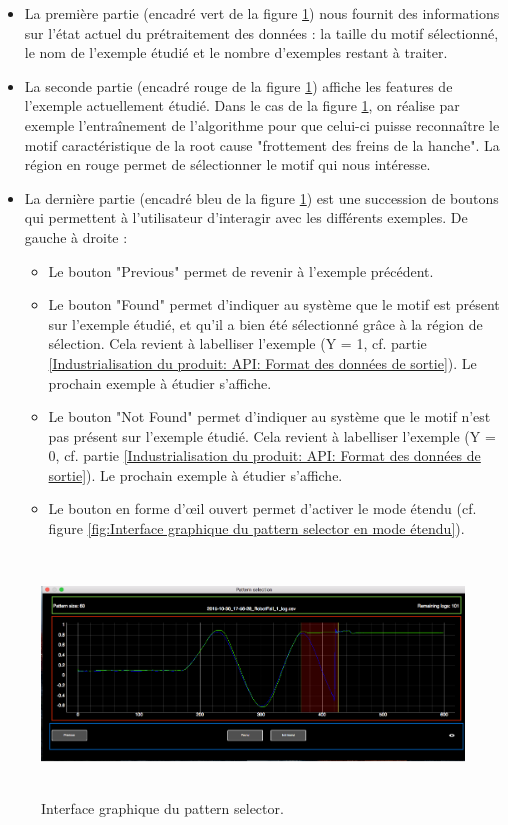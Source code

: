 \begin{itemize}
	\item La première partie (encadré vert de la figure \ref{fig:Interface graphique du pattern selector}) nous fournit des informations sur l'état actuel du prétraitement des données : la taille du motif sélectionné, le nom de l'exemple étudié et le nombre d'exemples restant à traiter. 
	\item La seconde partie (encadré rouge de la figure  \ref{fig:Interface graphique du pattern selector}) affiche les features de l'exemple actuellement étudié. Dans le cas de la figure  \ref{fig:Interface graphique du pattern selector}, on réalise par exemple l'entraînement de l'algorithme pour que celui-ci puisse reconnaître le motif caractéristique de la root cause "frottement des freins de la hanche". La région en rouge permet de sélectionner le motif qui nous intéresse.
	\item La dernière partie (encadré bleu de la figure  \ref{fig:Interface graphique du pattern selector}) est une succession de boutons qui permettent à l'utilisateur d'interagir avec les différents exemples. De gauche à droite :   
	\begin{itemize}
		\item Le  bouton "Previous" permet de revenir à l'exemple précédent.
		\item Le bouton "Found" permet d'indiquer au système que le motif est présent sur l'exemple étudié, et qu'il a bien été sélectionné grâce à la région de sélection. Cela revient à labelliser l'exemple (Y = 1, cf. partie \ref{Industrialisation du produit: API: Format des données de sortie}). Le prochain exemple à étudier s'affiche.
		\item Le bouton "Not Found" permet d'indiquer au système que le motif n'est pas présent sur l'exemple étudié. Cela revient à labelliser l'exemple (Y = 0, cf. partie \ref{Industrialisation du produit: API: Format des données de sortie}). Le prochain exemple à étudier s'affiche.
		\item Le bouton en forme d'œil ouvert permet d'activer le mode étendu (cf. figure \ref{fig:Interface graphique du pattern selector en mode étendu}).
	\end{itemize} 
\end{itemize} 

\begin{figure}[H]
	\centering\includegraphics[height=6.4cm]{images/pattern_selector.png}
	\caption[Interface graphique du pattern selector]{Interface graphique du pattern selector.}
	\label{fig:Interface graphique du pattern selector}
\end{figure}

